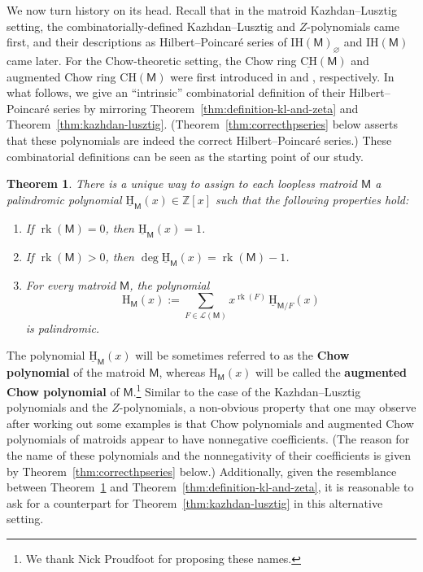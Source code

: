 \documentclass[11pt, a4paper, english]{amsart}
\theoremstyle{teoremas}
\newtheorem{theorem}{Theorem}[section]
\theoremstyle{definition}
\DeclareMathOperator{\rk}{rk}
\newcommand{\M}{\mathsf{M}}
\newcommand{\Z}{\mathbb{Z}}
\renewcommand{\H}{\mathrm{H}}
\newcommand{\CH}{\mathrm{CH}}
\newcommand{\IH}{\mathrm{IH}}
\newcommand{\uH}{\underline{\mathrm{H}}}
\newcommand{\uCH}{\underline{\mathrm{CH}}}
\begin{document}
We now turn history on its head. Recall that in the matroid Kazhdan--Lusztig setting, the combinatorially-defined Kazhdan--Lusztig and $Z$-polynomials came first, and their descriptions as Hilbert--Poincar\'e series of $\IH(\M)_\varnothing$ and $\IH(\M)$ came later.  For the Chow-theoretic setting, the Chow ring $\uCH(\M)$ and augmented Chow ring $\CH(\M)$ were first introduced in \cite{feichtner-yuzvinsky} and \cite{semismall}, respectively.  In what follows, we give an ``intrinsic'' combinatorial definition of their Hilbert--Poincar\'e series by mirroring Theorem~\ref{thm:definition-kl-and-zeta} and Theorem~\ref{thm:kazhdan-lusztig}.  (Theorem~\ref{thm:correcthpseries} below asserts that these polynomials are indeed the correct Hilbert--Poincar\'e series.)  These combinatorial definitions can be seen as the starting point of our study.

\begin{theorem}\label{thm:main-recursion-defi-H-and-uH}
    There is a unique way to assign to each loopless matroid $\M$ a palindromic polynomial $\uH_{\M}(x) \in \Z[x]$ such that the following properties hold:
    \begin{enumerate}[\normalfont(i)]
        \item If $\rk(\M) = 0$, then $\uH_{\M}(x) = 1$.\label{it:mainfirst}\
        \item If $\rk(\M) > 0$, then $\deg \uH_{\M}(x) = \rk(\M) - 1$.\label{it:mainsecond}
        \item For every matroid $\M$, the polynomial
            \[ \H_{\M}(x) := \sum_{F\in \mathcal{L}(\M)} x^{\rk(F)}\, \uH_{\M/F}(x)\]
        is palindromic.\label{it:mainthird}
    \end{enumerate}
\end{theorem}


The polynomial $\uH_{\M}(x)$ will be sometimes referred to as the \textbf{Chow polynomial} of the matroid $\M$, whereas $\H_{\M}(x)$ will be called the \textbf{augmented Chow polynomial} of $\M$.\footnote{We thank Nick Proudfoot for proposing these names.} Similar to the case of the Kazhdan--Lusztig polynomials and the $Z$-polynomials, a non-obvious property that one may observe after working out some examples is that Chow polynomials and augmented Chow polynomials of matroids appear to have nonnegative coefficients. (The reason for the name of these polynomials and the nonnegativity of their coefficients is given by Theorem~\ref{thm:correcthpseries} below.) Additionally, given the resemblance between Theorem~\ref{thm:main-recursion-defi-H-and-uH} and Theorem~\ref{thm:definition-kl-and-zeta}, it is reasonable to ask for a counterpart for Theorem~\ref{thm:kazhdan-lusztig} in this alternative setting.
\end{document}

